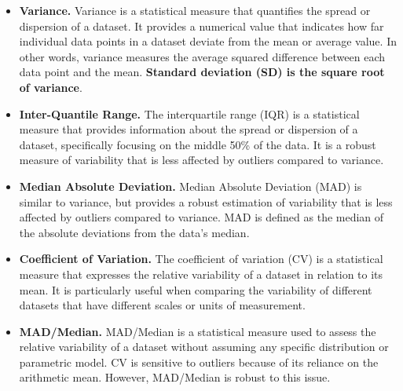 \documentclass[
]{book}
\begin{document}
\begin{itemize}
\item
  \textbf{Variance.} Variance is a statistical measure that quantifies the spread or dispersion of a dataset. It provides a numerical value that indicates how far individual data points in a dataset deviate from the mean or average value. In other words, variance measures the average squared difference between each data point and the mean. \textbf{Standard deviation (SD) is the square root of variance}.
\item
  \textbf{Inter-Quantile Range.} The interquartile range (IQR) is a statistical measure that provides information about the spread or dispersion of a dataset, specifically focusing on the middle 50\% of the data. It is a robust measure of variability that is less affected by outliers compared to variance.
\item
  \textbf{Median Absolute Deviation.} Median Absolute Deviation (MAD) is similar to variance, but provides a robust estimation of variability that is less affected by outliers compared to variance. MAD is defined as the median of the absolute deviations from the data's median.
\item
  \textbf{Coefficient of Variation.} The coefficient of variation (CV) is a statistical measure that expresses the relative variability of a dataset in relation to its mean. It is particularly useful when comparing the variability of different datasets that have different scales or units of measurement.
\item
  \textbf{MAD/Median.} MAD/Median is a statistical measure used to assess the relative variability of a dataset without assuming any specific distribution or parametric model. CV is sensitive to outliers because of its reliance on the arithmetic mean. However, MAD/Median is robust to this issue.
\end{itemize}
\end{document}
